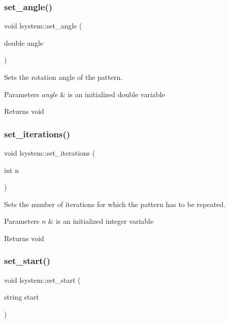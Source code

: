 \subsubsection{\texorpdfstring{set\+\_\+angle()}{set\_angle()}}
{\footnotesize\ttfamily void lsystem\+::set\+\_\+angle (\begin{DoxyParamCaption}\item[{double}]{angle }\end{DoxyParamCaption})}



Sets the rotation angle of the pattern. 


\begin{DoxyParams}{Parameters}
{\em angle} & is an initialized double variable \\
\hline
\end{DoxyParams}
\begin{DoxyReturn}{Returns}
void 
\end{DoxyReturn}
\mbox{\label{classlsystem_ad66281259d2c5aab49d499b590a1ef7e}} 
\subsubsection{\texorpdfstring{set\+\_\+iterations()}{set\_iterations()}}
{\footnotesize\ttfamily void lsystem\+::set\+\_\+iterations (\begin{DoxyParamCaption}\item[{int}]{n }\end{DoxyParamCaption})}



Sets the number of iterations for which the pattern has to be repeated. 


\begin{DoxyParams}{Parameters}
{\em n} & is an initialized integer variable \\
\hline
\end{DoxyParams}
\begin{DoxyReturn}{Returns}
void 
\end{DoxyReturn}
\mbox{\label{classlsystem_acaa745c30cefc50f8e26655faf915e4c}} 
\subsubsection{\texorpdfstring{set\+\_\+start()}{set\_start()}}
{\footnotesize\ttfamily void lsystem\+::set\+\_\+start (\begin{DoxyParamCaption}\item[{string}]{start }\end{DoxyParamCaption})}



